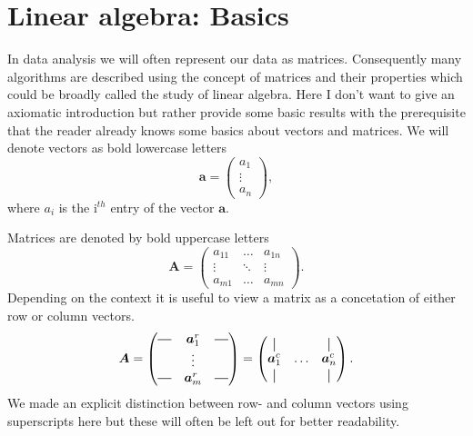 \chapter{Linear algebra: Basics}

In data analysis we will often represent our data as matrices. Consequently many algorithms are described using
the concept of matrices and their properties which could be broadly called the study of linear algebra. Here I
don’t want to give an axiomatic introduction but rather provide some basic results with the prerequisite that
the reader already knows some basics about vectors and matrices.
We will denote vectors as bold lowercase letters 
\begin{equation}
\bm{a} = 
\begin{pmatrix}
a_1     \\
\vdots  \\
a_n
\end{pmatrix},
\end{equation}
where $a_i$ is the $\text{i}^{th}$ entry of the vector $\bm{a}$.

Matrices are denoted by bold uppercase letters
\begin{equation}
    \bm{A} = 
    \begin{pmatrix}
        a_{11} & \hdots & a_{1n} \\ 
        \vdots & \ddots & \vdots \\
        a_{m1} & \hdots & a_{mn}
    \end{pmatrix}.
\end{equation}
Depending on the context it is useful to view a matrix as a concetation of either row or column vectors.
\begin{align}
    \bm{A} = \begin{pmatrix}
        \horzbar & \bm{a}_1^r & \horzbar \\
                  & \vdots   &  \\
        \horzbar & \bm{a}_m^r &  \horzbar \\
    \end{pmatrix} = 
    \begin{pmatrix}
    \vertbar &        & \vertbar \\
    \bm{a}_1^c & \hdots & \bm{a}_n^c \\
    \vertbar &        & \vertbar 
    \end{pmatrix}.
\end{align}
We made an explicit distinction between row- and column vectors using superscripts here but these will often be left out
for better readability.

